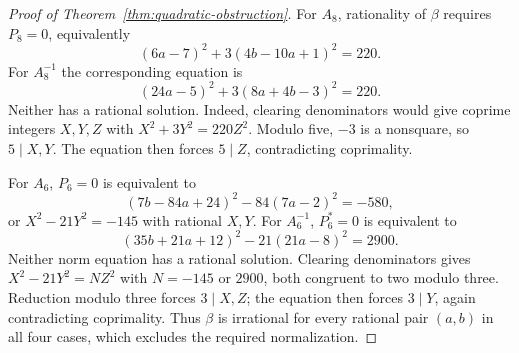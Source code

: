 \documentclass[10pt,a4paper]{amsart}
\begin{document}
\begin{proof}[Proof of Theorem~\ref{thm:quadratic-obstruction}]
For $A_8$, rationality of $\beta$ requires $P_8=0$, equivalently
\[
 (6a-7)^2+3(4b-10a+1)^2=220.
\]
For $A_8^{-1}$ the corresponding equation is
\[
 (24a-5)^2+3(8a+4b-3)^2=220.
\]
Neither has a rational solution. Indeed, clearing denominators would give
coprime integers $X,Y,Z$ with $X^2+3Y^2=220Z^2$. Modulo five,
$-3$ is a nonsquare, so $5\mid X,Y$. The equation then forces $5\mid Z$,
contradicting coprimality.

For $A_6$, $P_6=0$ is equivalent to
\[
 (7b-84a+24)^2-84(7a-2)^2=-580,
\]
or $X^2-21Y^2=-145$ with rational $X,Y$. For $A_6^{-1}$, $P_6^*=0$
is equivalent to
\[
 (35b+21a+12)^2-21(21a-8)^2=2900.
\]
Neither norm equation has a rational solution. Clearing denominators
gives $X^2-21Y^2=NZ^2$ with $N=-145$ or $2900$, both congruent to two
modulo three. Reduction modulo three forces $3\mid X,Z$; the equation
then forces $3\mid Y$, again contradicting coprimality.
Thus $\beta$ is irrational for every rational pair $(a,b)$ in all four
cases, which excludes the required normalization.
\end{proof}
\end{document}
